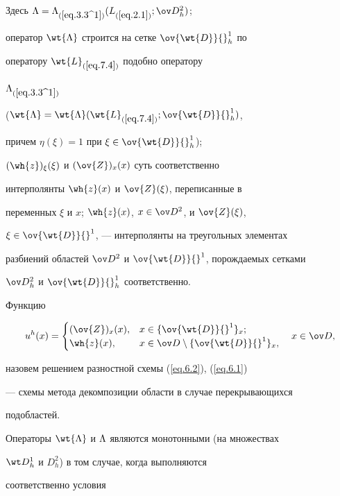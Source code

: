 Здесь $\La=\La_{(\ref{eq.3.3^1})}(L_{(\ref{eq.2.1})};\od{}^2_h)$;


оператор $\wt{\La}$ строится на сетке $\ov{\wt{D}}{}^1_h$ по


оператору $\wt{L}_{(\ref{eq.7.4})}$ подобно оператору


$\Lambda_{(\ref{eq.3.3^1})}$


($\wt{\La}=\wt{\La}(\wt{L}_{(\ref{eq.7.4})};\ov{\wt{D}}{}^1_h)$,


причем $\eta(\xi)=1$ при $\xi\in \ov{\wt{D}}{}^1_h$);


$(\wh{z})_{\xi}(\xi)$ и $(\ov{Z})_x(x)$ суть соответственно


интерполянты $\wh{z}(x)$ и $\ov{Z}(\xi)$, переписанные в


переменных $\xi$ и $x$; $\wh{z}(x)$, $x\in\od{}^2$, и $\ov{Z}(\xi)$,


$\xi\in \ov{\wt{D}}{}^1$, --- интерполянты на треугольных элементах


разбиений областей $\od{}^2$ и $\ov{\wt{D}}{}^1$, порождаемых сетками


$\od{}^2_h$ и $\ov{\wt{D}}{}^1_h$ соответственно.





Функцию


$$


u^h(x)=\begin{cases}


(\ov{Z})_x(x), & x\in\{\ov{\wt{D}}{}^1\}_x; \\


\wh{z}(x),  & x\in\od\setminus \{\ov{\wt{D}}{}^1\}_x,


\end{cases}


\quad x \in \od,


$$


назовем решением разностной схемы (\ref{eq.6.2}), (\ref{eq.6.1})


--- схемы метода декомпозиции области в случае перекрывающихся


подобластей.





Операторы $\wt{\La}$ и $\Lambda$ являются монотонными (на множествах


$\wt D{}^1_h$ и $D^2_h$) в том случае, когда выполняются


соответственно условия


